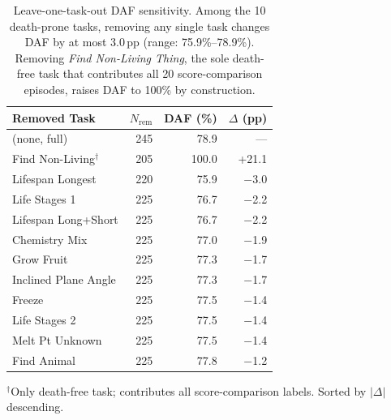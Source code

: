 \begin{table}[h]
\centering
\small
\caption{Leave-one-task-out DAF sensitivity. Among the 10 death-prone tasks, removing any single task changes DAF by at most 3.0\,pp (range: 75.9\%--78.9\%). Removing \emph{Find Non-Living Thing}, the sole death-free task that contributes all 20 score-comparison episodes, raises DAF to 100\% by construction.}
\label{tab:loto-daf}
\begin{tabular}{lrrr}
\toprule
Removed Task & $N_\text{rem}$ & DAF (\%) & $\Delta$ (pp) \\
\midrule
(none, full) & 245 & 78.9 & --- \\
\midrule
Find Non-Living$^\dagger$ & 205 & 100.0 & +21.1 \\
Lifespan Longest & 220 & 75.9 & $-$3.0 \\
Life Stages 1 & 225 & 76.7 & $-$2.2 \\
Lifespan Long+Short & 225 & 76.7 & $-$2.2 \\
Chemistry Mix & 225 & 77.0 & $-$1.9 \\
Grow Fruit & 225 & 77.3 & $-$1.7 \\
Inclined Plane Angle & 225 & 77.3 & $-$1.7 \\
Freeze & 225 & 77.5 & $-$1.4 \\
Life Stages 2 & 225 & 77.5 & $-$1.4 \\
Melt Pt Unknown & 225 & 77.5 & $-$1.4 \\
Find Animal & 225 & 77.8 & $-$1.2 \\
\bottomrule
\end{tabular}

\vspace{2pt}
{\footnotesize $^\dagger$Only death-free task; contributes all score-comparison labels. Sorted by $|\Delta|$ descending.}
\end{table}
